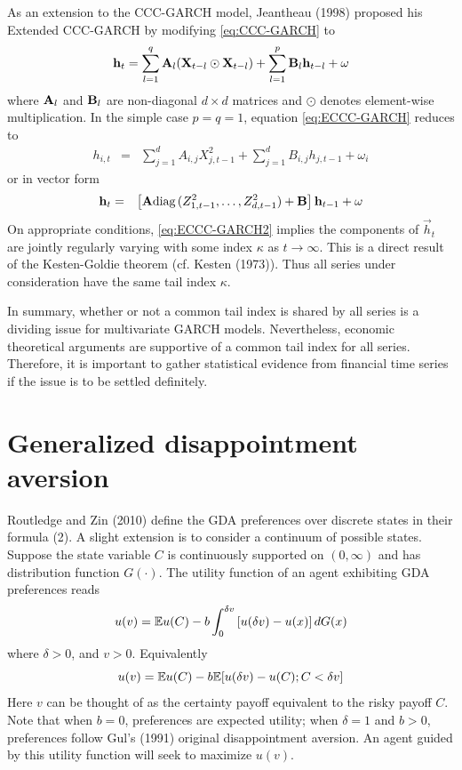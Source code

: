 \documentclass{article}
\begin{document}
As an extension to the CCC-GARCH model, Jeantheau (1998)
\cite{jeantheau1998strong} proposed his Extended CCC-GARCH by
modifying \eqref{eq:CCC-GARCH} to
\begin{equation}
  \label{eq:ECCC-GARCH}
  \mathbf{h}_t =
  \sum_{l=1}^q \mathbf{A}_{l} (\mathbf{X}_{t-l} \odot \mathbf{X}_{t-l})
  +
  \sum_{l=1}^p \mathbf{B}_{l} \mathbf{h}_{t-l}
  +
  \mathbf{\omega}
\end{equation}
where $\mathbf{A}_l$ and $\mathbf{B}_l$ are non-diagonal $d \times d$ matrices
and $\odot$ denotes element-wise multiplication. In the simple case $p=q=1$,
equation \eqref{eq:ECCC-GARCH} reduces to
\begin{eqnarray*}
  h_{i,t} &=&
  \sum_{j=1}^d A_{i,j} X_{j, t-1}^2
  + \sum_{j=1}^d B_{i,j} h_{j, t-1}
  + \omega_i
\end{eqnarray*}
or in vector form
\begin{eqnarray}
  \mathbf{h}_t &=& \left[
    \mathbf{A} \text{diag\,}(Z_{1, t-1}^2, \dots, Z_{d, t-1}^2) + \mathbf{B}
    \right] \mathbf{h}_{t-1} + \mathbf{\omega}
  \label{eq:ECCC-GARCH2}
\end{eqnarray}
On appropriate conditions, \eqref{eq:ECCC-GARCH2} implies the
components of $\vec h_t$ are jointly regularly varying with some index
$\kappa$ as $t \to \infty$. This is a direct result of the Kesten-Goldie
theorem (cf. Kesten (1973)\cite{Kesten1973}). Thus all series under
consideration have the same tail index $\kappa$.

In summary, whether or not a common tail index is shared by all
series is a dividing issue for multivariate GARCH
models. Nevertheless, economic theoretical arguments are supportive of
a common tail index for all series. Therefore, it is important to
gather statistical evidence from financial time series if the issue is
to be settled definitely.

\section{Generalized disappointment aversion}
\label{sec:GDA}
Routledge and Zin (2010) \cite{routledge2010generalized} define the GDA
preferences over discrete states in their formula (2). A slight extension
is to consider a continuum of possible states. Suppose the state variable
$C$ is continuously supported on $(0, \infty)$ and has distribution
function $G(\cdot)$. The utility function of an agent exhibiting GDA
preferences reads
\begin{equation}
  u(v)= \E u(C) - b \int_{0}^{\delta v}
  \left[ u(\delta v) - u(x) \right] dG(x)\label{11}%
\end{equation}
where $\delta > 0$, and $v>0$. Equivalently
\begin{equation}
  \label{eq:xxie0}
  u(v) = \mathbb{E} u(C) - b \mathbb{E}[u(\delta v) - u(C); C < \delta v]
\end{equation}
Here $v$ can be thought of as the certainty payoff equivalent to the
risky payoff $C$. Note that when $b=0$, 
preferences are expected utility; when $\delta=1$ and $b>0$,
preferences follow Gul's (1991) original disappointment aversion.
An agent guided by this utility function will seek to maximize $u(v)$.
\end{document}
